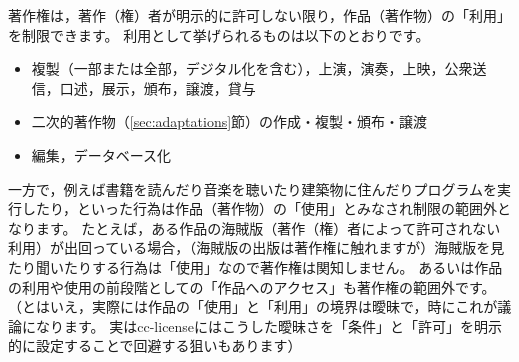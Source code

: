 \documentclass{ltjsarticle}
\begin{document}
著作権は，著作（権）者が明示的に許可しない限り，作品（著作物）の「利用」を制限できます。
利用として挙げられるものは以下のとおりです。
\begin{itemize}
\item 複製（一部または全部，デジタル化を含む），上演，演奏，上映，公衆送信，口述，展示，頒布，譲渡，貸与
\item 二次的著作物（\ref{sec:adaptations}節）の作成・複製・頒布・譲渡
\item 編集，データベース化
\end{itemize}

一方で，例えば書籍を読んだり音楽を聴いたり建築物に住んだりプログラムを実行したり，といった行為は作品（著作物）の「使用」とみなされ制限の範囲外となります。
たとえば，ある作品の海賊版（著作（権）者によって許可されない利用）が出回っている場合，（海賊版の出版は著作権に触れますが）海賊版を見たり聞いたりする行為は「使用」なので著作権は関知しません。
あるいは作品の利用や使用の前段階としての「作品へのアクセス」も著作権の範囲外です。
（とはいえ，実際には作品の「使用」と「利用」の境界は曖昧で，時にこれが議論になります。
実はcc-licenseにはこうした曖昧さを「条件」と「許可」を明示的に設定することで回避する狙いもあります）
\end{document}
